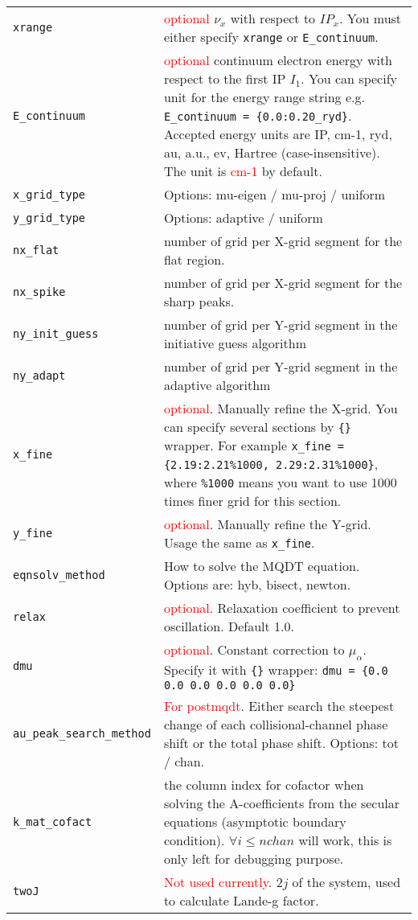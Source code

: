 \documentclass[11pt]{article}
\begin{document}
\begin{table}[]
\begin{tabular}{|p{5cm}|p{10.5cm}|}
\verb|xrange|& \textcolor{red}{optional} $\nu_x$ with respect to $IP_x$. You must either specify \verb|xrange| or \verb|E_continuum|.\\
\verb|E_continuum|&\textcolor{red}{optional} continuum electron energy with respect to the first IP $I_1$. You can specify unit for the energy range string e.g. \verb|E_continuum = {0.0:0.20_ryd}|. Accepted energy units are IP, cm-1, ryd, au, a.u., ev, Hartree (case-insensitive). The unit is \textcolor{red}{cm-1} by default.\\
\verb|x_grid_type|& Options: mu-eigen / mu-proj / uniform\\
\verb|y_grid_type|& Options: adaptive / uniform\\
\verb|nx_flat|& number of grid per X-grid segment for the flat region.\\
\verb|nx_spike|& number of grid per X-grid segment for the sharp peaks.\\
\verb|ny_init_guess|& number of grid per Y-grid segment in the initiative guess algorithm\\
\verb|ny_adapt|& number of grid per Y-grid segment in the adaptive algorithm\\
\verb|x_fine|& \textcolor{red}{optional}. Manually refine the X-grid. You can specify several sections by \verb|{}| wrapper. For example \verb|x_fine = {2.19:2.21%1000, 2.29:2.31%1000}|, where \verb|%1000| means you want to use 1000 times finer grid for this section.\\
\verb|y_fine|& \textcolor{red}{optional}. Manually refine the Y-grid. Usage the same as \verb|x_fine|.\\
\verb|eqnsolv_method|& How to solve the MQDT equation. Options are: hyb, bisect, newton.\\
\verb|relax|& \textcolor{red}{optional}. Relaxation coefficient to prevent oscillation. Default 1.0. \\
\verb|dmu|& \textcolor{red}{optional}. Constant correction to $\mu_{\alpha}$. Specify it with \verb|{}| wrapper: \verb|dmu = {0.0 0.0 0.0 0.0 0.0 0.0}| \\
\verb|au_peak_search_method|& \textcolor{red}{For postmqdt}. Either search the steepest change of each collisional-channel phase shift or the total   phase shift. Options: tot / chan. \\
\verb|k_mat_cofact|& the column index for cofactor when solving the A-coefficients from the secular equations (asymptotic boundary condition).
$\forall i \leq nchan$ will work, this is only left for debugging purpose. \\
\verb|twoJ|& \textcolor{red}{Not used currently}. $2j$ of the system, used to calculate Lande-g factor.\\
\hline
\end{tabular}
\end{table}
\end{document}
